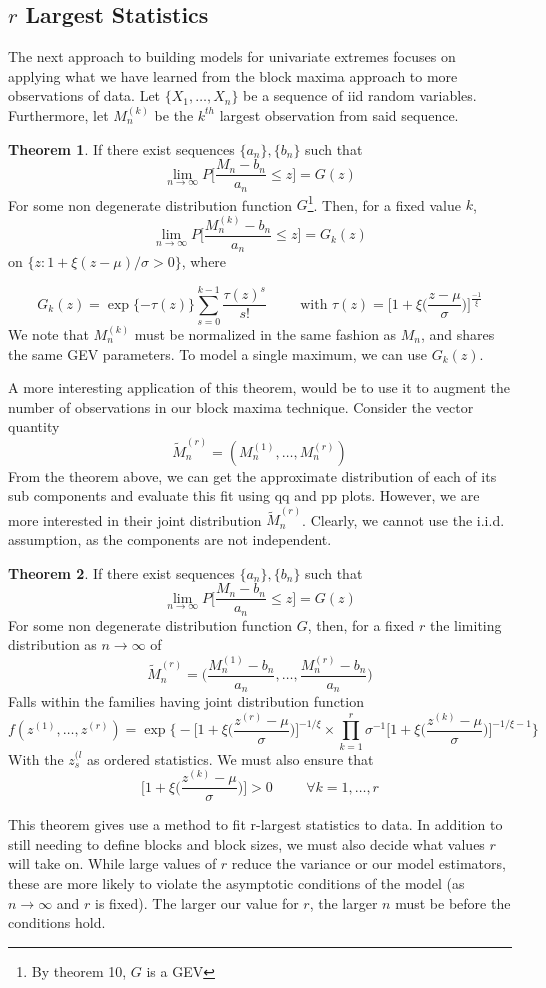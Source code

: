 \documentclass{article}
\theoremstyle{definition}
\newtheorem{theorem}{Theorem}
\theoremstyle{definition}
\def\Xs{\{X_1, \hdots, X_n\}}
\begin{document}
\subsection{$r$ Largest Statistics}
The next approach to building models for univariate extremes focuses on applying what we have learned from the block maxima approach to more observations of data. Let $\Xs$ be a sequence of iid random variables. Furthermore, let $M_n^{(k)}$ be the $k^{th}$ largest observation from said sequence.
\begin{theorem}
If there exist sequences $\{a_n\}, \{b_n\}$ such that 
\[\lim_{n\rightarrow \infty} P \bigg[ \frac{M_n-b_n}{a_n}\leq z \bigg]= G(z)\]
For some non degenerate distribution function $G$\footnote{By theorem 10, $G$ is a GEV}. Then, for a fixed value $k$,
\[\lim_{n\rightarrow \infty} P \bigg[ \frac{M_n^{(k)}-b_n}{a_n}\leq z \bigg]= G_k(z)\]
on $\{z:1+\xi(z-\mu)/\sigma > 0\}$, where

\[G_k(z)=\exp\{-\tau(z)\}\sum_{s=0}^{k-1}\frac{\tau(z)^s}{s!} \hspace{1cm} \text{with }\tau(z)=\bigg[1+\xi\bigg(\frac{z-\mu}{\sigma}\bigg)\bigg]^{\frac{-1}{\xi}} \]
We note that $M_n^{(k)}$ must be normalized in the same fashion as $M_n$, and shares the same GEV parameters. To model a single maximum, we can use $G_k(z)$.
\end{theorem}
A more interesting application of this theorem, would be to use it to augment the number of observations in our block maxima technique. Consider the vector quantity
\[\tilde{M}_n^{(r)} = (M_n^{(1)},\hdots, M_n^{(r)})\]
From the theorem above, we can get the approximate distribution of each of its sub components and evaluate this fit using qq and pp plots. However, we are more interested in their joint distribution $\tilde{M}_n^{(r)}$. Clearly, we cannot use the i.i.d. assumption, as the components are not independent.
\begin{theorem}
If there exist sequences $\{a_n\},\{b_n\}$ such that 
\[\lim_{n\rightarrow \infty} P \bigg[ \frac{M_n-b_n}{a_n}\leq z \bigg]= G(z)\]
For some non degenerate distribution function $G$, then, for a fixed $r$ the limiting distribution as $n \rightarrow \infty$ of
\[\tilde{M}_n^{(r)}= \bigg(\frac{M_n^{(1)}-b_n}{a_n},\hdots, \frac{M_n^{(r)}-b_n}{a_n} \bigg)\]
Falls within the families having joint distribution function 
\[f(z^{(1)}, \hdots,z^{(r)})= \exp \bigg\{ -\bigg[ 1+ \xi \bigg( \frac{z^{(r)} -\mu }{\sigma}\bigg)\bigg]^{-1/\xi}\times \prod_{k=1}^r \sigma^{-1} \bigg[ 1+ \xi \bigg( \frac{z^{(k)} -\mu }{\sigma}\bigg)\bigg]^{-1/\xi-1}\bigg\} \]
With the $z^{(l}_s$ as ordered statistics. We must also ensure that $$\bigg[ 1+ \xi \bigg( \frac{z^{(k)} -\mu }{\sigma}\bigg)\bigg] >0 \hspace{1cm} \forall k=1,\hdots,r $$
\end{theorem}
This theorem gives use a method to fit r-largest statistics to data. In addition to still needing to define blocks and block sizes, we must also decide what values $r$ will take on. While large values of $r$ reduce the variance or our model estimators, these are more likely to violate the asymptotic conditions of the model (as $n\rightarrow \infty$ and $r$ is fixed). The larger our value for $r$, the larger $n$ must be before the conditions hold.
\end{document}
